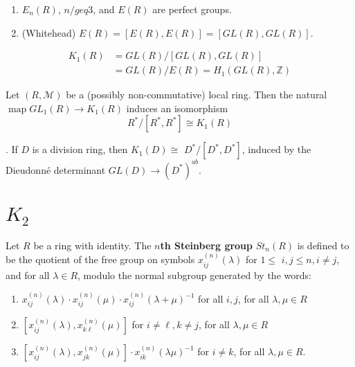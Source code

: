 \begin{lemm}
    \begin{enumerate}
        \item $E_n(R)$, $n/geq 3$, and $E(R)$ are perfect groups.
        \item (Whitehead) $E(R)=[E(R), E(R)]=[G L(R), G L(R)]$.
    \end{enumerate}
\end{lemm}

$$\begin{aligned} K_1(R) & =G L(R) /[G L(R), G L(R)] \\ & =G L(R) / E(R)=H_1(G L(R), \mathbb{Z})\end{aligned}$$


\begin{prop}
Let $(R, \mathcal{M})$ be a (possibly non-commutative) local ring. Then the natural $\operatorname{map} G L_1(R) \rightarrow K_1(R)$ induces an isomorphism
    $$
    R^* /\left[R^*, R^*\right] \cong K_1(R)
    $$    
\end{prop}

\begin{coro}
[Dieudonné]. If $D$ is a division ring, then $K_1(D) \cong$ $D^* /\left[D^*, D^*\right]$, induced by the Dieudonné determinant $G L(D) \rightarrow\left(D^*\right)^{a b}$.    
\end{coro}

\section{$K_2$}

Let $R$ be a ring with identity. The \textbf{$n$th Steinberg group} $S t_n(R)$ is defined to be the quotient of the free group on symbols $x_{i j}^{(n)}(\lambda)$ for $1 \leq$ $i, j \leq n, i \neq j$, and for all $\lambda \in R$, modulo the normal subgroup generated by the words:
\begin{enumerate}
    \item $x_{i j}^{(n)}(\lambda) \cdot x_{i j}^{(n)}(\mu) \cdot x_{i j}^{(n)}(\lambda+\mu)^{-1}$ for all $i, j$, for all $\lambda, \mu \in R$
    \item $\left[x_{i j}^{(n)}(\lambda), x_{k \ell}^{(n)}(\mu)\right]$ for $i \neq \ell, k \neq j$, for all $\lambda, \mu \in R$
    \item $\left[x_{i j}^{(n)}(\lambda), x_{j k}^{(n)}(\mu)\right] \cdot x_{i k}^{(n)}(\lambda \mu)^{-1}$ for $i \neq k$, for all $\lambda, \mu \in R$.
\end{enumerate}

